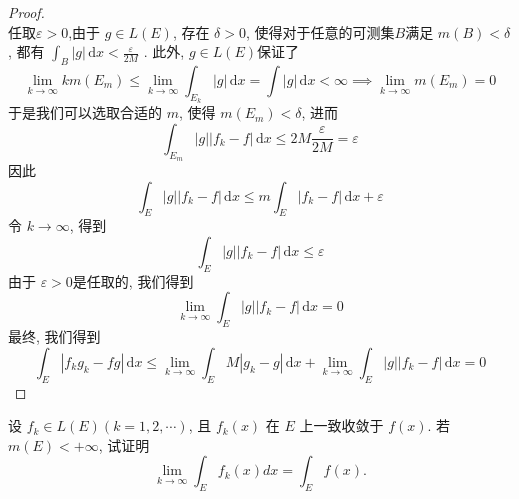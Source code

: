 \documentclass[../main.tex]{subfiles}
\begin{document}
\begin{proof}
\[\] 
 任取\(   \varepsilon > 0  \),由于 \(  g\in L\left( E \right)   \), 存在 \(   \delta > 0  \), 使得对于任意的可测集\(  B  \)满足 \(  m\left( B \right)<  \delta    \), 都有 \(  \int_{B}\left| g \right|\,\mathrm{d} x< \frac{ \varepsilon  }{2M }    \)   . 此外, \(  g\in L\left( E \right)   \)保证了 \[
 \lim_{k\to \infty}km\left( E_{m} \right) \le  \lim_{k\to \infty}\int_{E_{k}}\left| g \right| \,\mathrm{d} x=  \int \left| g \right|\,\mathrm{d} x< \infty\implies \lim_{k\to \infty}m\left( E_{m} \right)= 0  
 \] 于是我们可以选取合适的 \(  m  \),  使得 \(  m\left( E_{m} \right)<  \delta    \), 进而 \[
 \int_{E_{m}}\left| g \right|\left| f_{k}-f \right|\,\mathrm{d} x\le 2M \frac{ \varepsilon  }{2M }= \varepsilon  
 \]   因此 \[
 \int_{E}\left| g \right|\left| f_{k}-f \right|\,\mathrm{d} x\le m \int_{E}\left| f_{k}-f \right|\,\mathrm{d} x+  \varepsilon    
 \]令 \(  k\to \infty  \), 得到 \[
 \int_{E}\left| g \right|\left| f_{k}-f \right|\,\mathrm{d} x\le   \varepsilon   
 \] 由于 \(   \varepsilon > 0  \)是任取的, 我们得到 \[
 \lim_{k\to \infty}\int_{E}\left| g \right|\left| f_{k}-f \right|\,\mathrm{d} x= 0  
 \] 最终, 我们得到 \[
 \int_{E}\left| f_{k}g_{k}-fg \right|\,\mathrm{d} x\le \lim_{k\to \infty}\int_{E}M\left| g_{k}-g \right|\,\mathrm{d} x+ \lim_{k\to \infty} \int_{E}\left| g \right|\left| f_{k}-f \right|\,\mathrm{d} x= 0    
 \]
\end{proof}
\begin{exercise}{}{}
设 $f_k \in L(E) (k=1,2,\cdots)$, 且 $f_k(x)$ 在 $E$ 上一致收敛于 $f(x)$. 若 $m(E) < +\infty$, 试证明
\[
\lim_{k \to \infty} \int_E f_k(x) dx = \int_E f(x).
\]
\end{exercise}
\end{document}
